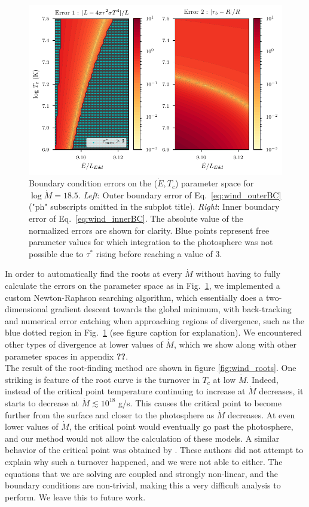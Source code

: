 \documentclass[../main.tex]{subfiles}
\newcommand{\Mdot}{\dot{M}}
\begin{document}
\begin{figure}
    \centering
    \includegraphics[width=\textwidth]{figures/errorspace_18_5.pdf}
    \caption{Boundary condition errors on the ($\dot{E},T_c$) parameter space for $\log\dot{M}=18.5$. \textit{Left}: Outer boundary error of Eq.~\eqref{eq:wind_outerBC} ("ph" subscripts omitted in the subplot title). \textit{Right}: Inner boundary error of Eq.~\eqref{eq:wind_innerBC}. The absolute value of the normalized errors are shown for clarity. Blue points represent free parameter values for which integration to the photosphere was not possible due to $\tau^*$ rising before reaching a value of 3.}
    \label{fig:errorspace_18_5}
\end{figure}

In order to automatically find the roots at every $\dot{M}$ without having to fully calculate the errors on the parameter space as in Fig.~\ref{fig:errorspace_18_5}, we implemented a custom Newton-Raphson searching algorithm, which essentially does a two-dimensional gradient descent towards the global minimum, with back-tracking and numerical error catching when approaching regions of divergence, such as the blue dotted region in Fig.~\ref{fig:errorspace_18_5} (see figure caption for explanation). We encountered other types of divergence at lower values of $\dot{M}$, which we show along with other parameter spaces in appendix \textbf{??}.\\

The result of the root-finding method are shown in figure \ref{fig:wind_roots}. One striking is feature of the root curve is the turnover in $T_c$ at low $\Mdot$. Indeed, instead of the critical point temperature continuing to increase at $\Mdot$ decreases, it starts to decrease at $\Mdot\lesssim 10^{18}$ g/s. This causes the critical point to become further from the surface and closer to the photosphere as $\Mdot$ decreases. At even lower values of $\Mdot$, the critical point would eventually go past the photosphere, and our method would not allow the calculation of these models. A similar behavior of the critical point was obtained by \citet{Paczynski1986b}. These authors did not attempt to explain why such a turnover happened, and we were not able to either. The equations that we are solving are coupled and strongly non-linear, and the boundary conditions are non-trivial, making this a very difficult analysis to perform. We leave this to future work.\\
\end{document}
